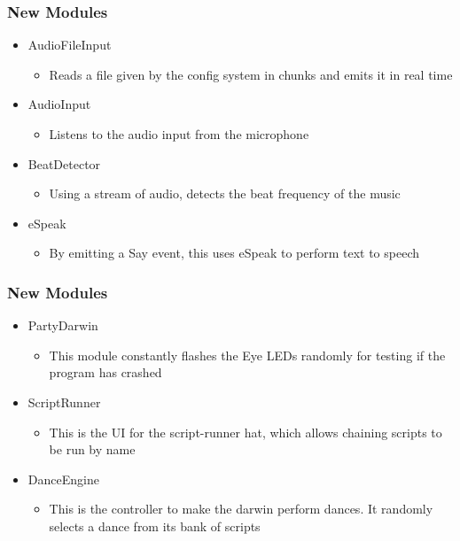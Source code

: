 \documentclass{beamer}
\begin{document}
\begin{frame}
	\frametitle{New Modules}
	\begin{itemize}
		\item AudioFileInput
			\begin{itemize}
				\item Reads a file given by the config system in chunks and emits it in real time
			\end{itemize}

		\item AudioInput
			\begin{itemize}
				\item Listens to the audio input from the microphone
			\end{itemize}

		\item BeatDetector
			\begin{itemize}
				\item Using a stream of audio, detects the beat frequency of the music
			\end{itemize}

		\item eSpeak
			\begin{itemize}
				\item By emitting a Say event, this uses eSpeak to perform text to speech
			\end{itemize}
	\end{itemize}
\end{frame}

\begin{frame}
	\frametitle{New Modules}
	\begin{itemize}
		\item PartyDarwin
			\begin{itemize}
				\item This module constantly flashes the Eye LEDs randomly for testing if the program has crashed
			\end{itemize}

		\item ScriptRunner
			\begin{itemize}
				\item This is the UI for the script-runner hat, which allows chaining scripts to be run by name
			\end{itemize}

		\item DanceEngine
			\begin{itemize}
				\item This is the controller to make the darwin perform dances. It randomly selects a dance from its bank of scripts
			\end{itemize}
	\end{itemize}
\end{frame}
\end{document}
